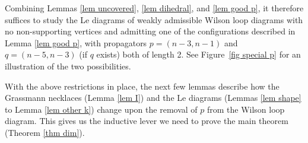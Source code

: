 \documentclass[11pt]{article}
\theoremstyle{remark}
\theoremstyle{definition}
\begin{document}
Combining Lemmas \ref{lem uncovered}, \ref{lem dihedral}, and \ref{lem good p}, it therefore suffices to study the Le diagrams of weakly admissible Wilson loop diagrams with no non-supporting vertices and admitting one of the configurations described in Lemma \ref{lem good p}, with propagators $p = (n-3, n-1)$ and $q= (n-5, n-3)$ (if $q$ exists) both of length 2. See Figure~\ref{fig special p} for an illustration of the two possibilities. 

With the above restrictions in place, the next few lemmas describe how the Grassmann necklaces (Lemma \ref{lem I}) and the Le diagrams (Lemmas \ref{lem shape} to Lemma \ref{lem other k}) change upon the removal of $p$ from the Wilson loop diagram.  This gives us the inductive lever we need to prove the main theorem (Theorem \ref{thm dim}).
\end{document}
